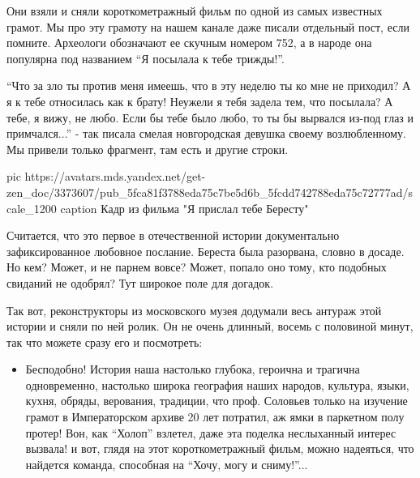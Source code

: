 Они взяли и сняли короткометражный фильм по одной из самых известных грамот. Мы
про эту грамоту на нашем канале даже писали отдельный пост, если помните.
Археологи обозначают ее скучным номером 752, а в народе она популярна под
названием \enquote{Я посылала к тебе трижды!}.

\enquote{Что за зло ты против меня имеешь, что в эту неделю ты ко мне не приходил? А я
к тебе относилась как к брату! Неужели я тебя задела тем, что посылала? А тебе,
я вижу, не любо. Если бы тебе было любо, то ты бы вырвался из-под глаз и
примчался...} - так писала смелая новгородская девушка своему возлюбленному. Мы
привели только фрагмент, там есть и другие строки.


\ifcmt
  pic https://avatars.mds.yandex.net/get-zen_doc/3373607/pub_5fca81f3788eda75c7be5d6b_5fcdd742788eda75c72777ad/scale_1200
  caption Кадр из фильма "Я прислал тебе Бересту"
\fi


Считается, что это первое в отечественной истории документально зафиксированное
любовное послание. Береста была разорвана, словно в досаде. Но кем? Может, и не
парнем вовсе? Может, попало оно тому, кто подобных свиданий не одобрял? Тут
широкое поле для догадок.

Так вот, реконструкторы из московского музея додумали весь антураж этой истории
и сняли по ней ролик. Он не очень длинный, восемь с половиной минут, так что
можете сразу его и посмотреть:


\begin{itemize}
\item {}

Бесподобно! История наша настолько глубока, героична и трагична одновременно,
настолько широка география наших народов, культура, языки,
кухня, обряды, верования, традиции, что проф. Соловьев только
на изучение грамот в Императорском архиве 20 лет потратил, аж
ямки в паркетном полу протер! Вон, как \enquote{Холоп} взлетел, даже
эта поделка неслыханный интерес вызвала! и вот, глядя на этот
короткометражный фильм, можно надеяться, что найдется команда,
способная на \enquote{Хочу, могу и сниму!}...
\end{itemize}
